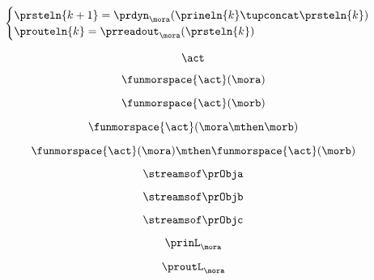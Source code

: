 \begin{forslides}
    \begin{equation}
        \label{eq:slides-processes-44}
        \begin{cases}
            \prsteln{k+1} = \prdyn_\mora(\prineln{k} \tupconcat \prsteln{k}) \\
            \prouteln{k}   = \prreadout_\mora(\prsteln{k})
        \end{cases}
    \end{equation}

    \begin{equation}
        \label{eq:slides-processes-45}
        \act
    \end{equation}

    \begin{equation}
        \label{eq:slides-processes-46}
        \funmorspace{\act}(\mora)
    \end{equation}

    \begin{equation}
        \label{eq:slides-processes-47}
        \funmorspace{\act}(\morb)
    \end{equation}

    \begin{equation}
        \label{eq:slides-processes-48}
        \funmorspace{\act}(\mora \mthen \morb)
    \end{equation}

    \begin{equation}
        \label{eq:slides-processes-49}
        \funmorspace{\act}(\mora) \mthen \funmorspace{\act}(\morb)
    \end{equation}

    \begin{equation}
        \label{eq:slides-processes-50}
        \streamsof \prObja
    \end{equation}

    \begin{equation}
        \label{eq:slides-processes-51}
        \streamsof \prObjb
    \end{equation}

    \begin{equation}
        \label{eq:slides-processes-52}
        \streamsof \prObjc
    \end{equation}

    \begin{equation}
        \label{eq:slides-processes-53}
        \prinL_\mora
    \end{equation}

    \begin{equation}
        \label{eq:slides-processes-54}
        \proutL_\mora
    \end{equation}


\end{forslides}
